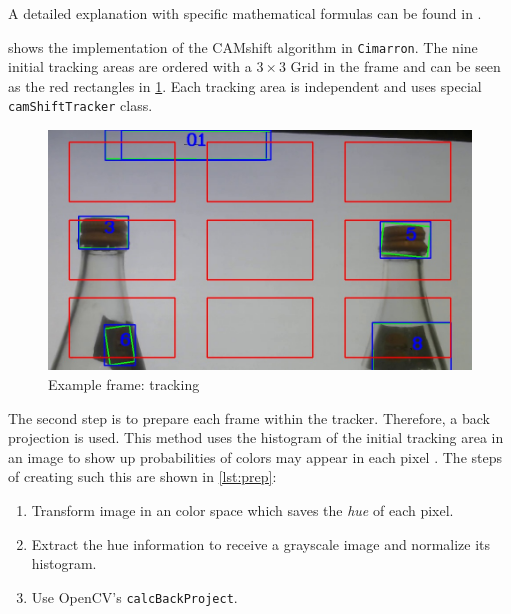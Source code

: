A detailed explanation with specific mathematical formulas can be found in \cite{Bradski98computervision}.

\begin{figure}[ht!]\centering
\end{figure}

 shows the implementation of the CAMshift algorithm in \texttt{Cimarron}. The nine initial tracking areas are ordered with a $3\times 3$ Grid in the frame and can be seen as the red rectangles in \cref{fig:example:cam}. Each tracking area is independent and uses special \texttt{camShiftTracker} class.

\begin{figure}\centering
    \includegraphics[scale=0.35]{images/tracking-example.jpg}
    \caption{Example frame: tracking}
    \label{fig:example:cam}
\end{figure}

The second step is to prepare each frame within the tracker. Therefore, a back projection is used. This method uses the histogram of the initial tracking area in an image to show up probabilities of colors may appear in each pixel \cite{OpenCVme45:online}. The steps of creating such this are shown in \cref{lst:prep}:
\begin{enumerate}
    \item Transform image in an color space which saves the \textit{hue} of each pixel.
    \item Extract the hue information to receive a grayscale image and normalize its histogram.
    \item Use OpenCV's \texttt{calcBackProject}.
\end{enumerate}


